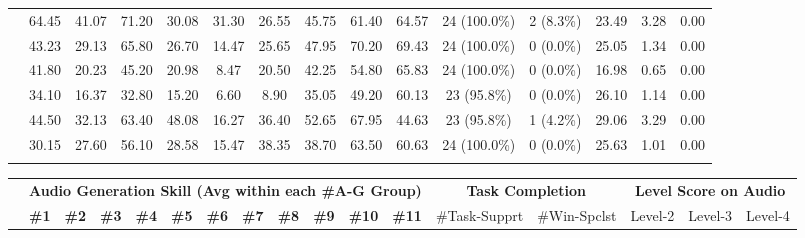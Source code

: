 \documentclass[letterpaper]{article} %
\begin{document}
{\begin{table*}[t!]
\begin{tabular}{p{2.2cm} ccccccccc cc ccc}
\rowcolor{bg-tb-light-audio} \multirow{1}{*}{ WavLLM} & 64.45 & 41.07 & 71.20 & 30.08 & 31.30 & 26.55 & 45.75 & 61.40 & 64.57 & 24 (100.0\%) & 2 (8.3\%) & 23.49 & 3.28 & 0.00 \\
\addlinespace[4pt]


\multirow{1}{*}{ NExT-GPT-V1.5} & 43.23 & 29.13 & 65.80 & 26.70 & 14.47 & 25.65 & 47.95 & 70.20 & 69.43 & 24 (100.0\%) & 0 (0.0\%) & 25.05 & 1.34 & 0.00 \\
\addlinespace[4pt]


\rowcolor{bg-tb-light-audio} \multirow{1}{*}{ PandaGPT (13B)} & 41.80 & 20.23 & 45.20 & 20.98 & 8.47 & 20.50 & 42.25 & 54.80 & 65.83 & 24 (100.0\%) & 0 (0.0\%) & 16.98 & 0.65 & 0.00 \\
\addlinespace[4pt]

\multirow{1}{*}{ ModaVerse-7b-v0} & 34.10 & 16.37 & 32.80 & 15.20 & 6.60 & 8.90 & 35.05 & 49.20 & 60.13 & 23 (95.8\%) & 0 (0.0\%) & 26.10 & 1.14 & 0.00 \\
\addlinespace[4pt]
 
\rowcolor{bg-tb-light-audio} \multirow{1}{*}{ Any-GPT} & 44.50 & 32.13 & 63.40 & 48.08 & 16.27 & 36.40 & 52.65 & 67.95 & 44.63 & 23 (95.8\%) & 1 (4.2\%) & 29.06 & 3.29 & 0.00 \\
\addlinespace[4pt]

\multirow{1}{*}{ Unified-io-2-XXL} & 30.15 & 27.60 & 56.10 & 28.58 & 15.47 & 38.35 & 38.70 & 63.50 & 60.63 & 24 (100.0\%) & 0 (0.0\%) & 25.63 & 1.01 & 0.00 \\
\addlinespace[4pt]

\Xhline{1.5pt}
\end{tabular}%
{
\fontsize{7.5}{8}\selectfont 
\setlength{\tabcolsep}{0.7mm}
\begin{tabular}{p{2cm} ccccccccccc cc ccc}

\addlinespace[2pt]

 \rowcolor{bg-tb-heavey-audio} & \multicolumn{11}{c}{\bf \textcolor{blueGen}{Audio Generation Skill (Avg within each \#A-G Group)}} & \multicolumn{2}{c}{\bf Task Completion} & \multicolumn{3}{c}{\bf Level Score on Audio} \\ 

\rowcolor{bg-tb-heavey-audio} \multicolumn{1}{c}{\multirow{-2}{*}{\bf  Model}}  &  \bf\#1 & \bf\#2 & \bf\#3 & \bf\#4 & \bf\#5 & \bf\#6 & \bf\#7 & \bf\#8 & \bf\#9 & \bf\#10 & \bf\#11 & 
\multirow{1}{*}{\parbox{1.6cm}{\#Task-Supprt}} & \multirow{1}{*}{\parbox{1.6cm}{\#Win-Spclst}} & \multirow{1}{*}{Level-2}  & \multirow{1}{*}{Level-3}  & \multirow{1}{*}{Level-4}  \\
  \midrule


\end{tabular}}
\end{table*}}
\end{document}
